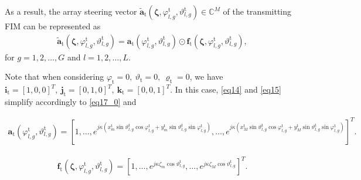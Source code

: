 \documentclass[lettersize,journal]{IEEEtran}
\begin{document}
As a result, the array steering vector $\tilde{\mathbf{a}}_{\textrm{t}}\left ( \boldsymbol{\zeta}, \varphi_{l,g}^{\textrm{t}}, \vartheta_{l,g}^{\textrm{t}} \right )\in \mathbb{C}^{M}$ of the transmitting FIM can be represented as
\begin{align}\label{eq16}
 \tilde{\mathbf{a}}_{\textrm{t}}\left ( \boldsymbol{\zeta}, \varphi_{l,g}^{\textrm{t}}, \vartheta_{l,g}^{\textrm{t}} \right )=\mathbf{a}_{\textrm{t}}\left ( \varphi_{l,g}^{\textrm{t}}, \vartheta_{l,g}^{\textrm{t}} \right )\odot\mathbf{f}_{\textrm{t}}\left ( \boldsymbol{\zeta}, \varphi_{l,g}^{\textrm{t}}, \vartheta_{l,g}^{\textrm{t}} \right ),
\end{align}
for $g=1,2,\ldots,G$ and $l=1,2,\ldots,L$.

Note that when considering $\varphi _{\textrm{t}}=0,\ \vartheta _{\textrm{t}}=0,\ \varrho _{\textrm{t}}=0$, we have $\mathbf{i}_{\textrm{t}}=\left [ 1,0,0 \right ]^{T},\ \mathbf{j}_{\textrm{t}}=\left [ 0,1,0 \right ]^{T},\ \mathbf{k}_{\textrm{t}}=\left [ 0,0,1 \right ]^{T}$. In this case, \eqref{eq14} and \eqref{eq15} simplify accordingly to \eqref{eq17_0} and
\begin{figure*}[!t]
\begin{align}\label{eq17_0}
\mathbf{a}_{\textrm{t}}\left ( \varphi_{l,g}^{\textrm{t}}, \vartheta_{l,g}^{\textrm{t}} \right )=\left [ 1,\ldots , e^{j\kappa \left ( x_{m}^{\textrm{t}}\sin\vartheta_{l,g}^{\textrm{t}} \cos\varphi_{l,g}^{\textrm{t}}+y_{m}^{\textrm{t}}\sin\vartheta_{l,g}^{\textrm{t}} \sin\varphi_{l,g}^{\textrm{t}} \right )}, \ldots ,e^{j\kappa \left ( x_{M}^{\textrm{t}}\sin\vartheta_{l,g}^{\textrm{t}} \cos\varphi_{l,g}^{\textrm{t}}+y_{M}^{\textrm{t}}\sin\vartheta_{l,g}^{\textrm{t}} \sin\varphi_{l,g}^{\textrm{t}} \right )} \right ]^{T}.
\end{align}
\end{figure*}
\begin{align}
 \mathbf{f}_{\textrm{t}}\left ( \boldsymbol{\zeta}, \varphi_{l,g}^{\textrm{t}}, \vartheta_{l,g}^{\textrm{t}} \right )=\left [ 1,\ldots , e^{j\kappa \zeta_{m}\cos\vartheta_{l,g}^{\textrm{t}} }, \ldots ,e^{j\kappa \zeta_{M}\cos\vartheta_{l,g}^{\textrm{t}} } \right ]^{T}.
\end{align}
\end{document}
